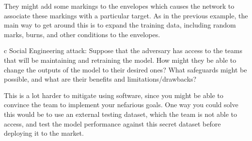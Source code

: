 \documentclass[expanded]{lkx_pset}
\begin{document}
\begin{parts}
\begin{parts}
		They might add some markings to the envelopes which causes the network to associate these markings with a particular target. As in the previous example, the main way to get around this is to expand the training data, including random marks, burns, and other conditions to the envelopes.

		\begin{part}{c}
			Social Engineering attack: Suppose that the adversary
			has access to the teams that will be maintaining and
			retraining the model.  How might they be able to change the
			outputs of the model to their desired ones?  What safeguards
			might be possible, and what are their benefits and
			limitations/drawbacks?
		\end{part}

		This is a lot harder to mitigate using software, since you might be able to convince the team to implement your nefarious goals. One way you could solve this would be to use an external testing dataset, which the team is not able to access, and test the model performance against this secret dataset before deploying it to the market.
	\end{parts}
\end{parts}

%
%
\end{document}
